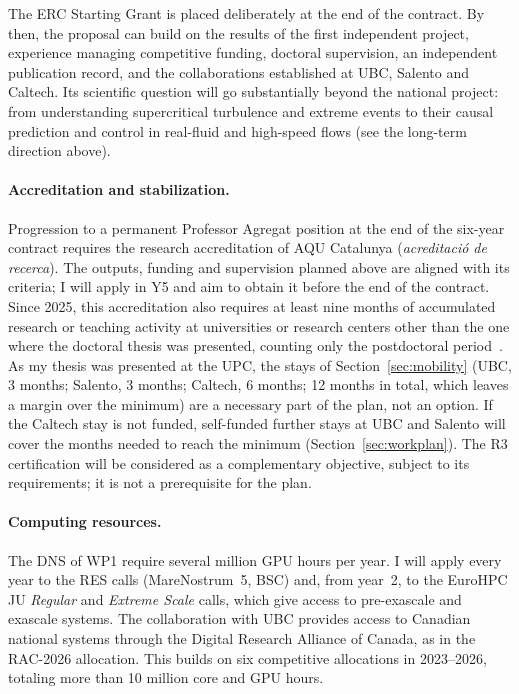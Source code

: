 \documentclass[11pt]{article}
\begin{document}
The ERC Starting Grant is placed deliberately at the end of the contract. By then, the
proposal can build on the results of the first independent project, experience managing
competitive funding, doctoral supervision, an independent publication record, and the
collaborations established at UBC, Salento and Caltech. Its scientific question
will go substantially beyond the national project: from understanding supercritical turbulence
and extreme events to their causal prediction and control in real-fluid and high-speed flows
(see the long-term direction above).

\paragraph{Accreditation and stabilization.} Progression to a permanent Professor Agregat
position at the end of the six-year contract requires the research accreditation of AQU
Catalunya (\emph{acreditaci\'o de recerca}). The outputs, funding and supervision planned
above are aligned with its criteria; I will apply in Y5 and aim to obtain it before the end
of the contract. Since 2025, this accreditation also requires at least nine months of
accumulated research or teaching activity at universities or research centers other than the
one where the doctoral thesis was presented, counting only the postdoctoral
period~\cite{AQU2025}. As my thesis was presented at the UPC, the stays of
Section~\ref{sec:mobility} (UBC, 3 months; Salento, 3 months; Caltech, 6 months;
12 months in total, which leaves a margin over the minimum) are a necessary part of the plan, not an option. If the Caltech stay is not funded, self-funded further
stays at UBC and Salento will cover the months needed to reach the minimum (Section~\ref{sec:workplan}). The R3 certification will be considered as a complementary objective, subject
to its requirements; it is not a prerequisite for the plan.

\paragraph{Computing resources.} The DNS of WP1 require several million GPU hours per year. I will apply every year to the RES calls (MareNostrum~5, BSC) and, from year~2, to
the EuroHPC JU \emph{Regular} and \emph{Extreme Scale} calls, which give access to
pre-exascale and exascale systems. The collaboration with UBC provides access to Canadian
national systems through the Digital Research Alliance of Canada, as in the RAC-2026
allocation. This builds on six competitive allocations in 2023--2026, totaling more than 10
million core and GPU hours.
\end{document}
